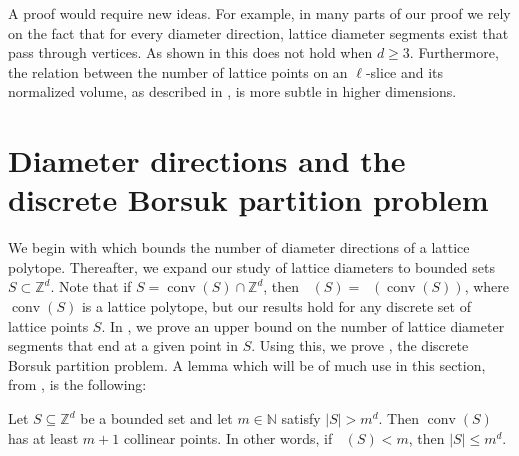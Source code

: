 \documentclass[11pt]{article}
\newcommand{\Z}{\mathbb{Z}}
\newcommand{\N}{\mathbb{N}}
\DeclareMathOperator{\conv}{conv}
\DeclareMathOperator{\ldiam}{diam_\Z}
\DeclareMathOperator{\diam}{diam}
\begin{document}
A proof would require new ideas. For example, in many parts of our proof we rely on the fact that for every diameter direction, lattice diameter segments exist that pass through vertices. As shown in  this does not hold when $d \geq 3$. Furthermore, the relation between the number of lattice points on an $\ell$-slice and its normalized volume, as described in , is more subtle in higher dimensions.
\section{Diameter directions and the discrete Borsuk partition problem} \label{sec:directions-Borsuk}

We begin with  which bounds the number of diameter directions of a lattice polytope. Thereafter, we expand our study of lattice diameters to bounded sets $S \subset \Z^d$. Note that if $S = \conv(S) \cap \Z^d$, then $\ldiam(S)=\ldiam(\conv (S))$, where $\conv (S)$ is a lattice polytope, but our results hold for any discrete set of lattice points $S$. In , we prove an upper bound on the number of lattice diameter segments that end at a given point in $S$. Using this, we prove , the discrete Borsuk partition problem. A lemma which will be of much use in this section, from \cite{rabi89}, is the following:

\begin{lemma}[Rabinowitz, 1989]\label{lemma:Rabinowitz}
    Let $S \subseteq \Z^d$ be a bounded set and let $m \in \N$ satisfy $|S| > m^d$. Then $\conv (S)$ has at least $m+1$ collinear points. In other words, if $\ldiam(S)<m$, then $|S| \leq  m^d$.
\end{lemma}

\end{document}
